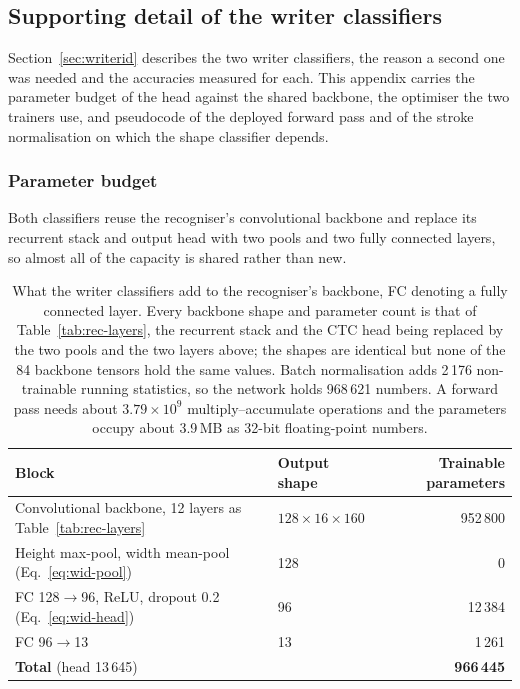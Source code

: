 
\subsection{Supporting detail of the writer classifiers}
\label{sec:app-wid}

Section~\ref{sec:writerid} describes the two writer classifiers, the reason a second one was needed and the accuracies measured for each.
This appendix carries the parameter budget of the head against the shared backbone, the optimiser the two trainers use, and pseudocode of the deployed forward pass and of the stroke normalisation on which the shape classifier depends.

\subsubsection{Parameter budget}

Both classifiers reuse the recogniser's convolutional backbone and replace its recurrent stack and output head with two pools and two fully connected layers, so almost all of the capacity is shared rather than new.

\begin{table}[!htbp]
\centering
\fontsize{8}{9.6}\selectfont
\setlength{\tabcolsep}{4pt}
\begin{tabular}{|l|l|r|}
\hline
\textbf{Block} & \textbf{Output shape} & \textbf{Trainable parameters} \\
\hline
Convolutional backbone, 12 layers as Table~\ref{tab:rec-layers} & $128\times16\times160$ & 952\,800 \\
Height max-pool, width mean-pool (Eq.~\ref{eq:wid-pool}) & 128 & 0 \\
FC 128$\to$96, ReLU, dropout 0.2 (Eq.~\ref{eq:wid-head}) & 96 & 12\,384 \\
FC 96$\to$13 & 13 & 1\,261 \\
\hline
\textbf{Total} (head 13\,645) & & \textbf{966\,445} \\
\hline
\end{tabular}
\caption{What the writer classifiers add to the recogniser's backbone, FC denoting a fully connected layer. Every backbone shape and parameter count is that of Table~\ref{tab:rec-layers}, the recurrent stack and the CTC head being replaced by the two pools and the two layers above; the shapes are identical but none of the 84 backbone tensors hold the same values. Batch normalisation adds 2\,176 non-trainable running statistics, so the network holds 968\,621 numbers. A forward pass needs about $3.79\times10^9$ multiply--accumulate operations and the parameters occupy about 3.9\,MB as 32-bit floating-point numbers.}
\label{tab:wid-layers}
\end{table}

